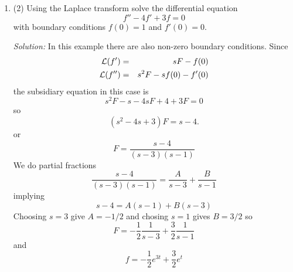 \documentclass[12pt]{article}
\begin{document}
\begin{enumerate}
\item (2)
Using the Laplace transform solve the differential equation
\begin{equation}
f''-4f'+3f=0
\end{equation}
with boundary conditions $f(0)=1$ and $f'(0)=0$.

\noindent\textit{Solution:} In this example there are also non-zero
boundary conditions. Since
\begin{eqnarray}
{\cal L}(f')&=&sF-f(0)\\
{\cal L}(f'')&=&s^2F-sf(0)-f'(0)
\end{eqnarray}
the subsidiary equation in this case is
\begin{equation}
s^2F-s-4sF+4+3F=0
\end{equation}
so
\begin{equation}
(s^2-4s+3)F=s-4.
\end{equation}
or
\begin{equation}
F=\frac{s-4}{(s-3)(s-1)}
\end{equation}
We do partial fractions
\begin{equation}
\frac{s-4}{(s-3)(s-1)}=\frac{A}{s-3}+\frac{B}{s-1}
\end{equation}
implying
\begin{equation}
s-4=A(s-1)+B(s-3)
\end{equation}
Choosing $s=3$ give $A=-1/2$ and chosing $s=1$ gives $B=3/2$ so
\begin{equation}
F=-\frac{1}{2}\frac{1}{s-3}+\frac{3}{2}\frac{1}{s-1}
\end{equation}
and
\begin{equation}
f=-\frac{1}{2}e^{3t}+\frac{3}{2}e^t
\end{equation}






\end{enumerate}

\vfill

\noindent
\end{document}
